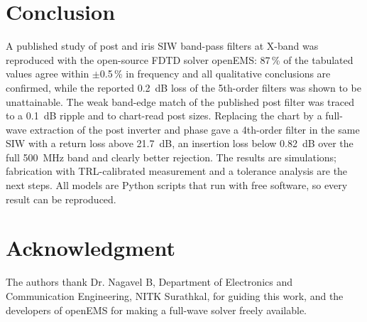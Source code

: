 \documentclass[conference]{IEEEtran}
\begin{document}
\section{Conclusion}
A published study of post and iris SIW band-pass filters at X-band was reproduced with the open-source FDTD solver openEMS: 87\,\% of the tabulated values agree within $\pm$0.5\,\% in frequency and all qualitative conclusions are confirmed, while the reported 0.2~dB loss of the 5th-order filters was shown to be unattainable. The weak band-edge match of the published post filter was traced to a 0.1~dB ripple and to chart-read post sizes. Replacing the chart by a full-wave extraction of the post inverter and phase gave a 4th-order filter in the same SIW with a return loss above 21.7~dB, an insertion loss below 0.82~dB over the full 500~MHz band and clearly better rejection. The results are simulations; fabrication with TRL-calibrated measurement and a tolerance analysis are the next steps. All models are Python scripts that run with free software, so every result can be reproduced.

\section*{Acknowledgment}
The authors thank Dr. Nagavel B, Department of Electronics and Communication Engineering, NITK Surathkal, for guiding this work, and the developers of openEMS for making a full-wave solver freely available.
\end{document}
